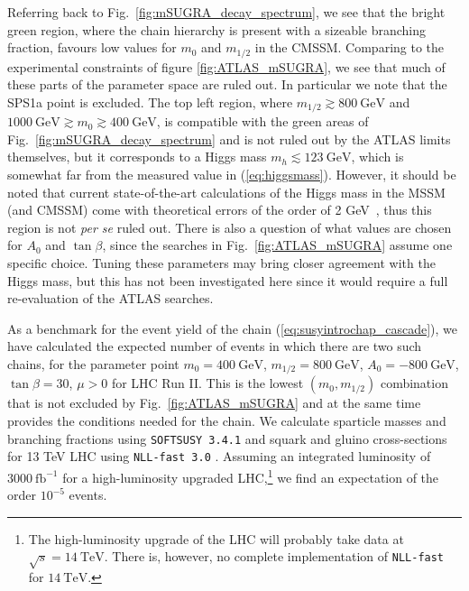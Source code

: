 \documentclass[twoside,english]{uiofysmaster}
\begin{document}
Referring back to Fig.\ \ref{fig:mSUGRA_decay_spectrum}, we see that the bright green region, where the chain hierarchy is present with a sizeable branching fraction, favours low values for $m_0$ and $m_{1/2}$ in the CMSSM. Comparing to the experimental constraints of figure \ref{fig:ATLAS_mSUGRA}, we see that much of these parts of the parameter space are ruled out. In particular we note that the SPS1a point is excluded. The top left region, where $m_{1/2} \gtrsim 800~\mathrm{GeV}$ and $1000 ~\mathrm{GeV} \gtrsim m_0 \gtrsim 400 ~\mathrm{GeV}$, is compatible with the green areas of Fig.\ \ref{fig:mSUGRA_decay_spectrum} and is not ruled out by the ATLAS limits themselves, but it corresponds to a Higgs mass $m_h \lesssim 123 ~\mathrm{GeV}$, which is somewhat far from the measured value in (\ref{eq:higgsmass}). However, it should be noted that current state-of-the-art calculations of the Higgs mass in the MSSM (and CMSSM) come with theoretical errors of the order of 2 GeV~\cite{Heinemeyer:2015dsa}, thus this region is not {\it per se} ruled out. There is also a question of what values are chosen for $A_0$ and $\tan\beta$, since the searches in Fig.\ \ref{fig:ATLAS_mSUGRA} assume one specific choice. Tuning these parameters may bring closer agreement with the Higgs mass, but this has not been investigated here since it would require a full re-evaluation of the ATLAS searches.

As a benchmark for the event yield of the chain (\ref{eq:susyintrochap_cascade}), we have calculated the expected number of events in which there are two such chains, for the parameter point $m_0 = 400 ~\mathrm{GeV}$, $m_{1/2} = 800 ~\mathrm{GeV}$, $A_0 = -800~\mathrm{GeV}$, $\tan\beta = 30$, $\mu>0$ for LHC Run II. This is the lowest $(m_0,m_{1/2})$ combination that is not excluded by Fig.\ \ref{fig:ATLAS_mSUGRA} and at the same time provides the conditions needed for the chain. We calculate sparticle masses and branching fractions using {\tt SOFTSUSY 3.4.1} \cite{Allanach:2001kg} and squark and gluino cross-sections for 13 TeV LHC using {\tt NLL-fast 3.0} \cite{Beenakker:1996ch,Kulesza:2008jb,Kulesza:2009kq,Beenakker:2009ha,Beenakker:2011fu,Beenakker:1997ut,Beenakker:2010nq}. Assuming an integrated luminosity of $3000~\mathrm{fb}^{-1}$ for a high-luminosity upgraded LHC,\footnote{The high-luminosity upgrade of the LHC will probably take data at $\sqrt{s}=14~\mathrm{TeV}$. There is, however, no complete implementation of {\tt NLL-fast} for $14 ~\mathrm{TeV}$.} we find an expectation of the order $10^{-5}$ events.
\end{document}
